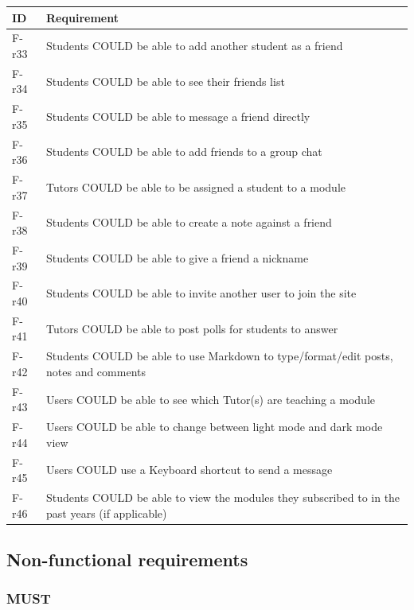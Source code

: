 \begin{tabular}{|p{1cm}|p{13cm}|}
    \hline
        \textbf{ID} & \textbf{Requirement} \\
    \hline
    F-r33 &
    Students COULD be able to add another student as a friend \\
    \hline
    F-r34 &
    Students COULD be able to see their friends list \\
    \hline
    F-r35 &
    Students COULD be able to message a friend directly \\
    \hline
    F-r36 &
    Students COULD be able to add friends to a group chat \\
    \hline
    F-r37 &
    Tutors COULD be able to be assigned a student to a module \\
    \hline
    F-r38 &
    Students COULD be able to create a note against a friend \\
    \hline
    F-r39 &
    Students COULD be able to give a friend a nickname \\
    \hline
    F-r40 &
    Students COULD be able to invite another user to join the site \\
    \hline
    F-r41 &
    Tutors COULD be able to post polls for students to answer \\
    \hline
    F-r42 &
    Students COULD be able to use Markdown to type/format/edit posts, notes and comments \\
    \hline
    F-r43 &
    Users COULD be able to see which Tutor(s) are teaching a module \\
    \hline
    F-r44 &
    Users COULD be able to change between light mode and dark mode view \\
    \hline
    F-r45 &
    Users COULD use a Keyboard shortcut to send a message \\
    \hline
    F-r46 &
    Students COULD be able to view the modules they subscribed to in the past years (if applicable) \\
    \hline
\end{tabular}
    
\subsection{Non-functional requirements}
\subsubsection{MUST}

